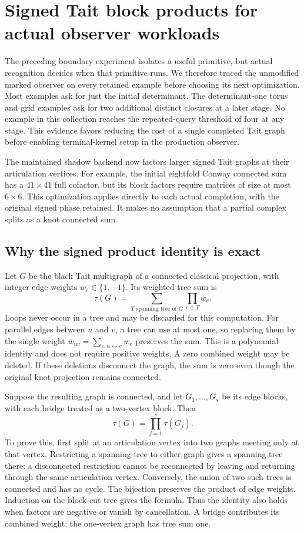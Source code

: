 \section{Signed Tait block products for actual observer workloads}
\label{sec:tait-blocks}

The preceding boundary experiment isolates a useful primitive, but actual
recognition decides when that primitive runs.  We therefore traced the
unmodified marked observer on every retained example before choosing its
next optimization.  Most examples ask for just the initial determinant.
The determinant-one torus and grid examples ask for two additional distinct
closures at a later stage.  No example in this collection reaches the
repeated-query threshold of four at any stage.  This evidence favors reducing
the cost of a single completed Tait graph before enabling terminal-kernel
setup in the production observer.

The maintained shadow backend now factors larger signed Tait graphs at their
articulation vertices.  For example, the initial eightfold Conway connected
sum has a $41\times41$ full cofactor, but its block factors require matrices
of size at most $6\times6$.  This optimization applies directly to each
actual completion, with the original signed phase retained.  It makes no
assumption that a partial complex splits as a knot connected sum.

\subsection{Why the signed product identity is exact}

Let $G$ be the black Tait multigraph of a connected classical projection,
with integer edge weights $w_e\in\{1,-1\}$.  Its weighted tree sum is
\[
 \tau(G)=\sum_{T\text{ spanning tree of }G}\prod_{e\in T}w_e.
\]
Loops never occur in a tree and may be discarded for this computation.
For parallel edges between $u$ and $v$, a tree can use at most one, so
replacing them by the single weight
$w_{uv}=\sum_{e:u\leftrightarrow v}w_e$ preserves the sum.  This is a
polynomial identity and does not require positive weights.  A zero combined
weight may be deleted.  If these deletions disconnect the graph, the sum is
zero even though the original knot projection remains connected.

Suppose the resulting graph is connected, and let $G_1,\ldots,G_s$ be its
edge blocks, with each bridge treated as a two-vertex block.  Then
\[
 \boxed{\tau(G)=\prod_{j=1}^s\tau(G_j).}
\]
To prove this, first split at an articulation vertex into two graphs meeting
only at that vertex.  Restricting a spanning tree to either graph gives a
spanning tree there: a disconnected restriction cannot be reconnected by
leaving and returning through the same articulation vertex.  Conversely,
the union of two such trees is connected and has no cycle.  The bijection
preserves the product of edge weights.  Induction on the block-cut tree
gives the formula.  Thus the identity also holds when factors are negative
or vanish by cancellation.  A bridge contributes its combined weight; the
one-vertex graph has tree sum one.

